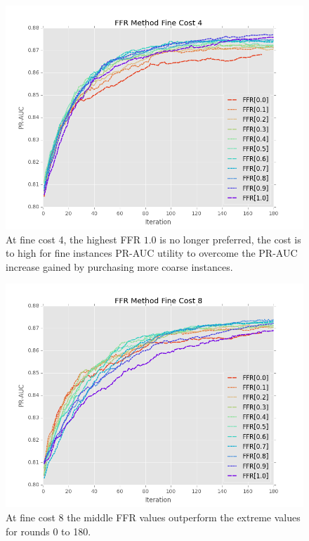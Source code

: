 \documentclass[ms]{nuthesis}
\begin{document}
\FloatBarrier
\begin{figure}[!htb]
	\centering
    \includegraphics[width=1.0\columnwidth]{fig/ParamsFFR_PR_Cost4_rnds0_180}
    \caption{At fine cost 4, the highest FFR $1.0$ is no longer preferred, the
    cost is to high for fine instances PR-AUC utility to overcome the PR-AUC
    increase gained by purchasing more coarse instances.}
    \label{fig:ParamsFFR_PR_Cost4_rnds0_180}
\end{figure}
\FloatBarrier


\FloatBarrier
\begin{figure}[!htb]
	\centering
    \includegraphics[width=1.0\columnwidth]{fig/ParamsFFR_PR_Cost8_rnds0_180}
    \caption{At fine cost 8 the middle FFR values outperform the extreme values
    for rounds 0 to 180.}
    \label{fig:ParamsFFR_PR_Cost8_rnds0_180}
\end{figure}
\FloatBarrier
\end{document}
